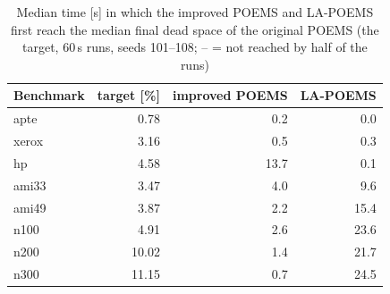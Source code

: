 \begin{table}
\centering
\small
\begin{tabular}{@{}lrrr@{}}
\toprule
Benchmark & target [\%] & improved POEMS & LA-POEMS \\
\midrule
apte & 0.78 & 0.2 & 0.0 \\
xerox & 3.16 & 0.5 & 0.3 \\
hp & 4.58 & 13.7 & 0.1 \\
ami33 & 3.47 & 4.0 & 9.6 \\
ami49 & 3.87 & 2.2 & 15.4 \\
n100 & 4.91 & 2.6 & 23.6 \\
n200 & 10.02 & 1.4 & 21.7 \\
n300 & 11.15 & 0.7 & 24.5 \\
\bottomrule
\end{tabular}
\caption{Median time [s] in which the improved POEMS and LA-POEMS first reach the median final dead space of the original POEMS (the target, 60\,s runs, seeds 101--108; -- = not reached by half of the runs)}
\label{tab:ttt}
\end{table}
